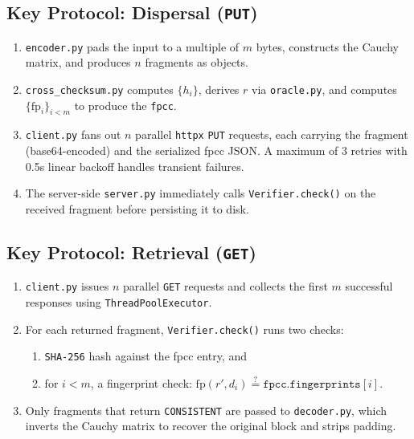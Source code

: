 \documentclass[10pt]{article}
\begin{document}
\subsection{Key Protocol: Dispersal (\texttt{PUT})}

\begin{enumerate}
  \item \texttt{encoder.py} pads the input to a multiple of $m$ bytes, constructs the Cauchy matrix, and produces $n$ fragments as  objects.
  \item \texttt{cross\_checksum.py} computes $\{h_i\}$, derives $r$ via \texttt{oracle.py}, and computes $\{\mathrm{fp}_i\}_{i<m}$ to produce the \texttt{fpcc}.
  \item \texttt{client.py} fans out $n$ parallel \texttt{httpx} \texttt{PUT} requests, each carrying the fragment (base64-encoded) and the serialized fpcc JSON.  A maximum of 3 retries with 0.5s linear backoff handles transient failures.
  \item The server-side \texttt{server.py} immediately calls \texttt{Verifier.check()} on the received fragment before persisting it to disk.
\end{enumerate}

\subsection{Key Protocol: Retrieval (\texttt{GET})}
\begin{enumerate}
      \item \texttt{client.py} issues $n$ parallel \texttt{GET} requests and collects the first $m$ successful responses using \texttt{Thread\-Pool\-Executor}.
      \item For each returned fragment, \texttt{Verifier.check()} runs two checks:
            \begin{enumerate}[label=(\alph*), topsep=0pt, itemsep=0pt, parsep=0pt]
                  \item \texttt{SHA-256} hash against the fpcc entry, and
                  \item for $i < m$, a fingerprint check: $\mathrm{fp}(r', d_i) \stackrel{?}{=} \texttt{fpcc.fingerprints}[i]$.
            \end{enumerate}
      \item Only fragments that return \texttt{CONSISTENT} are passed to \texttt{decoder.py}, which inverts the Cauchy matrix to recover the original block and strips padding.
\end{enumerate}
\end{document}

